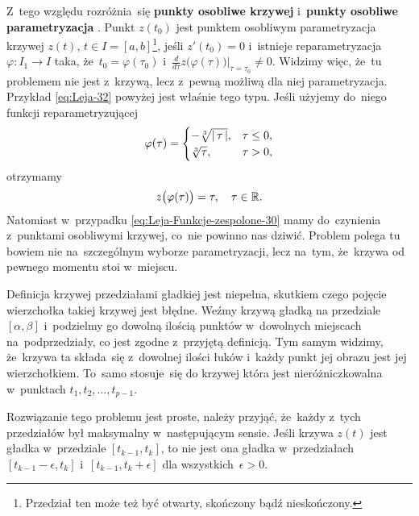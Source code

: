 \documentclass[a4paper,11pt]{article}
\begin{document}
Z~tego względu rozróżnia~się \textbf{punkty osobliwe krzywej}
i~\textbf{punkty osobliwe parametryzacja}
\cite{GdowskiElementGeometriiRozniczkowejZZadaniami1999}. Punkt
$z( t_{ 0 } )$ jest punktem osobliwym parametryzacja krzywej $z( t )$,
$t \in I = [ a, b ]$\footnote{Przedział ten może też być otwarty,
  skończony bądź nieskończony.}, jeśli $z'( t_{ 0 } ) = 0$ i~istnieje
reparametryzacja $\varphi: I_{ 1 } \to I$ taka,
że~$t_{ 0 } = \varphi( \tau_{ 0 } )$
i~$\tfrac{ d }{ d \tau } z\big( \varphi( \tau ) \big)|_{ \tau = \tau_{
    0 } } \neq 0$. Widzimy więc, że~tu problemem nie jest z~krzywą,
lecz z~pewną możliwą dla niej parametryzacja. Przykład
\eqref{eq:Leja-32} powyżej jest właśnie tego typu. Jeśli użyjemy
do~niego funkcji reparametryzującej
\begin{equation}
  \label{eq:Leja-Funkcje-zespolone-33}
  \varphi( \tau ) =
  \begin{cases}
    -\sqrt[3]{ |\, {  \tau  } \,| }, & \tau \leq 0, \\
    \sqrt[3]{ \tau }, & \tau > 0,
  \end{cases}
\end{equation}
otrzymamy
\begin{equation}
  \label{eq:Leja-Funkcje-zespolone-34}
  z\big( \varphi( \tau ) \big) = \tau, \quad \tau \in \mathbb{R}.
\end{equation}
Natomiast w~przypadku \eqref{eq:Leja-Funkcje-zespolone-30} mamy
do~czynienia z~punktami osobliwymi krzywej, co~nie powinno nas dziwić.
Problem polega tu bowiem nie na~szczególnym wyborze parametryzacji, lecz
na~tym, że~krzywa od pewnego momentu stoi w~miejscu.

\vspace{\spaceFour}





\noindent
{} Definicja krzywej przedziałami gładkiej jest niepełna,
skutkiem czego pojęcie wierzchołka takiej krzywej jest błędne. Weźmy
krzywą gładką na przedziale $[ \alpha, \beta ]$ i~podzielmy go dowolną ilością
punktów w~dowolnych miejscach na~podprzedziały, co jest zgodne z~przyjętą
definicją. Tym samym widzimy, że~krzywa ta składa~się z~dowolnej ilości
łuków i~każdy punkt jej obrazu jest jej wierzchołkiem. To~samo stosuje~się
do krzywej która jest nieróżniczkowalna w~punktach
$t_{ 1 }, t_{ 2 }, \ldots, t_{ p - 1 }$.

Rozwiązanie tego problemu jest proste, należy przyjąć, że~każdy z~tych
przedziałów był maksymalny w~następującym sensie. Jeśli krzywa
$z( t )$ jest gładka w~przedziale $[ t_{ k - 1 }, t_{ k } ]$, to nie
jest ona gładka w~przedziałach $[ t_{ k - 1 } - \epsilon, t_{ k } ]$
i~$[ t_{ k - 1 }, t_{ k } + \epsilon ]$ dla wszystkich~$\epsilon > 0$.
\end{document}
